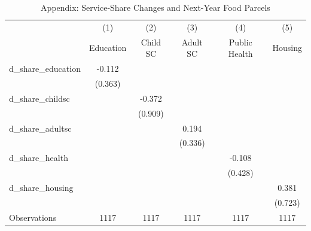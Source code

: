 \begin{table}[htbp]\centering
\def\sym#1{\ifmmode^{#1}\else\(^{#1}\)\fi}
\caption{Appendix: Service-Share Changes and Next-Year Food Parcels}
\begin{tabular}{l*{5}{c}}
\toprule
                    &\multicolumn{1}{c}{(1)}&\multicolumn{1}{c}{(2)}&\multicolumn{1}{c}{(3)}&\multicolumn{1}{c}{(4)}&\multicolumn{1}{c}{(5)}\\
                    &\multicolumn{1}{c}{Education}&\multicolumn{1}{c}{Child SC}&\multicolumn{1}{c}{Adult SC}&\multicolumn{1}{c}{Public Health}&\multicolumn{1}{c}{Housing}\\
\midrule
d\_share\_education   &      -0.112         &                     &                     &                     &                     \\
                    &     (0.363)         &                     &                     &                     &                     \\
\addlinespace
d\_share\_childsc     &                     &      -0.372         &                     &                     &                     \\
                    &                     &     (0.909)         &                     &                     &                     \\
\addlinespace
d\_share\_adultsc     &                     &                     &       0.194         &                     &                     \\
                    &                     &                     &     (0.336)         &                     &                     \\
\addlinespace
d\_share\_health      &                     &                     &                     &      -0.108         &                     \\
                    &                     &                     &                     &     (0.428)         &                     \\
\addlinespace
d\_share\_housing     &                     &                     &                     &                     &       0.381         \\
                    &                     &                     &                     &                     &     (0.723)         \\
\midrule
Observations        &        1117         &        1117         &        1117         &        1117         &        1117         \\

\end{tabular}
\end{table}

